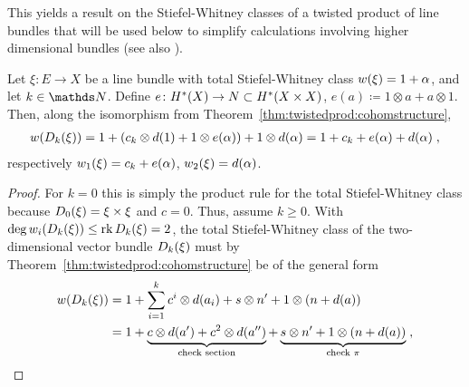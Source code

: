 This yields a result on the Stiefel-Whitney classes of
a twisted product of line bundles that will be used below to simplify
calculations involving higher dimensional bundles (see also
\cite[Prop.~7.4, p.~1113]{brown}).
\begin{Cor}\label{cor:twistedprod:swlinebdl}
  Let $\xi\colon E\to X$ be a line bundle with total Stiefel-Whitney
  class ${w}(\xi)=1+\alpha$, and let $k\in\Nat$.
  Define $e\colon H^*(X)\to N\subset H^*(X\times X)$,
  $e(a)\coloneqq 1\otimes a+a\otimes 1$.
  Then, along the isomorphism from
  Theorem~\ref{thm:twistedprod:cohomstructure},
  \begin{gather*}
    {w}(D_{k}({\xi})) = 1+ (c_k\otimes d(1)+1\otimes
    e(\alpha)) + 1\otimes d(\alpha)
    = 1+c_k+e(\alpha)+d(\alpha)
    \;,
  \end{gather*}
  respectively ${w_{1}}(\xi) = c_k+e(\alpha)$, ${w_{2}}(\xi)=d(\alpha)$.
  \begin{proof}
    For $k=0$ this is simply the product rule for the total
    Stiefel-Whitney class because $D_{0}({\xi})=\xi\times\xi$
    and $c=0$. Thus, assume $k\geq0$.
    With $\deg{w_{i}}(D_{k}({\xi}))\leq\operatorname{rk}D_{k}({\xi})=2$,
    the total Stiefel-Whitney class of the two-dimensional vector bundle
    $D_{k}({\xi})$ must by
    Theorem~\ref{thm:twistedprod:cohomstructure} be of the general
    form
    \begin{align*}
      \W{\Twistedprod{k}{\xi}}
      &= 1
        + \sum_{i=1}^k c^i\otimes d(a_i)
        + s\otimes n'
        + 1\otimes(n+d(a))
         \\
      &\equalsby{}
        1
        + \underbrace{
        c\otimes d(a') + c^2\otimes d(a'')
        }_{\text{check section}}
        + \underbrace{
        s\otimes n'
        + 1\otimes(n+d(a))
        }_{\text{check $\pi$}}
        \;,
    \end{align*}

\end{proof}
\end{Cor}

